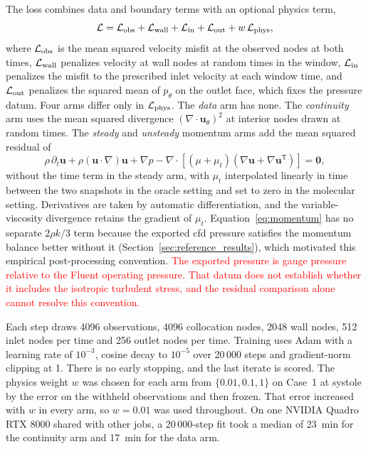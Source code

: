 \documentclass[12pt,a4paper]{article}
\newcommand{\cfdrevision}[1]{\textcolor{red}{#1}}
\newcommand{\CFD}{\ac{cfd}\xspace}
\theoremstyle{definition}
\numberwithin{equation}{section}
\begin{document}
The loss combines data and boundary terms with an optional physics term,
\begin{equation}
\mathcal L=\mathcal L_{\rm obs}+\mathcal L_{\rm wall}+\mathcal L_{\rm in}+\mathcal L_{\rm out}+w\,\mathcal L_{\rm phys},
\label{eq:loss}
\end{equation}
where $\mathcal L_{\rm obs}$ is the mean squared velocity misfit at the observed nodes at both times, $\mathcal L_{\rm wall}$ penalizes velocity at wall nodes at random times in the window, $\mathcal L_{\rm in}$ penalizes the misfit to the prescribed inlet velocity at each window time, and $\mathcal L_{\rm out}$ penalizes the squared mean of $p_\theta$ on the outlet face, which fixes the pressure datum. Four arms differ only in $\mathcal L_{\rm phys}$. The \emph{data} arm has none. The \emph{continuity} arm uses the mean squared divergence $(\nabla\cdot\mathbf u_\theta)^2$ at interior nodes drawn at random times. The \emph{steady} and \emph{unsteady} momentum arms add the mean squared residual of
\begin{equation}
\rho\,\partial_t\mathbf u+\rho(\mathbf u\cdot\nabla)\mathbf u
+\nabla p-\nabla\cdot\left[(\mu+\mu_t)
(\nabla\mathbf u+\nabla\mathbf u^{\mathsf T})\right]=\mathbf 0,
\label{eq:momentum}
\end{equation}
without the time term in the steady arm, with $\mu_t$ interpolated linearly in time between the two snapshots in the oracle setting and set to zero in the molecular setting. Derivatives are taken by automatic differentiation, and the variable-viscosity divergence retains the gradient of $\mu_t$. Equation~\eqref{eq:momentum} has no separate $2\rho k/3$ term because the exported \CFD pressure satisfies the momentum balance better without it (Section~\ref{sec:reference_results}), which motivated this empirical post-processing convention. \cfdrevision{The exported pressure is gauge pressure relative to the Fluent operating pressure. That datum does not establish whether it includes the isotropic turbulent stress, and the residual comparison alone cannot resolve this convention.}

Each step draws 4096 observations, 4096 collocation nodes, 2048 wall nodes, 512 inlet nodes per time and 256 outlet nodes per time. Training uses Adam with a learning rate of $10^{-3}$, cosine decay to $10^{-5}$ over 20\,000 steps and gradient-norm clipping at 1. There is no early stopping, and the last iterate is scored. The physics weight $w$ was chosen for each arm from $\{0.01,0.1,1\}$ on Case~1 at systole by the error on the withheld observations and then frozen. That error increased with $w$ in every arm, so $w=0.01$ was used throughout. On one NVIDIA Quadro RTX 8000 shared with other jobs, a 20\,000-step fit took a median of 23~min for the continuity arm and 17~min for the data arm.
\end{document}
